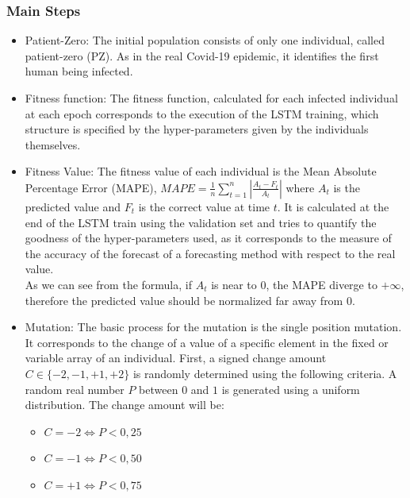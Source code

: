 \documentclass[letterpaper]{article}%
\begin{document}
\subsubsection{Main Steps} 
\label{subsec:mainSteps}
\begin{itemize}
\item Patient-Zero: The initial population consists of only one individual, called patient-zero (PZ). As in the real Covid-19 epidemic, it identifies the first human being infected.
\item Fitness function: The fitness function, calculated for each infected individual at each epoch corresponds to the execution of the LSTM training, which structure is specified by the hyper-parameters given by the individuals themselves.
\item Fitness Value: The fitness value of each individual is the Mean Absolute Percentage Error (MAPE), $ MAPE = \frac{1}{n}\sum_{t=1}^{n}|\frac{A_t-F_t}{A_t}| $ where $ A_t $ is the predicted value and $ F_t $ is the correct value at time $ t $. It is calculated at the end of the LSTM train using the validation set and tries to quantify the goodness of the hyper-parameters used, as it corresponds to the measure of the accuracy of the forecast of a forecasting method with respect to the real value.\\
As we can see from the formula, if $ A_t $ is near to 0, the MAPE diverge to $ +\infty $, therefore the predicted value should be normalized far away from 0. 
\item Mutation: The basic process for the mutation is the single position mutation. It corresponds to the change of a value of a specific element in the fixed or variable array of an individual.
First, a signed change amount \begin{math}C \in \{-2 ,-1, +1, +2\}\end{math} is randomly determined using the following criteria. A random real number $P$ between $0$ and $1$ is generated using a uniform distribution. The change amount will be:
\begin{itemize}
\item \begin{math}C=-2 \iff P<0,25\end{math}
\item \begin{math}C=-1 \iff P<0,50\end{math}
\item \begin{math}C=+1 \iff P<0,75\end{math}

\end{itemize}
\end{itemize}
\end{document}
